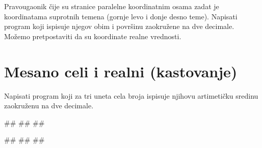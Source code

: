 \begin{Exercise}[label=p1_13] 
Pravougaonik čije su stranice paralelne koordinatnim osama zadat je koordinatama suprotnih temena (gornje levo i donje desno teme). Napisati program koji ispisuje njegov obim i površinu zaokružene na dve decimale. Možemo pretpostaviti da su koordinate realne vrednosti.
\\
\end{Exercise}
\begin{Answer}[ref=p1_13]
\end{Answer}

\section{Mesano celi i realni (kastovanje)}

\begin{Exercise}[label=v1.1_09] 
Napisati program koji za tri uneta cela broja ispisuje njihovu artimetičku sredinu zaokruženu na dve decimale.\\
\begin{miditest}
\begin{upotreba}{1}
#\naslovInt#
##
##
\end{upotreba}
\end{miditest}
\begin{miditest}
\begin{upotreba}{2}
#\naslovInt#
##
##
\end{upotreba}
\end{miditest}

\end{Exercise}
\begin{Answer}[ref=v1.1_09]
\end{Answer}







